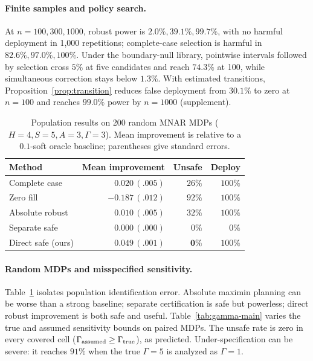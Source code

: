 \documentclass[letterpaper]{article}
\theoremstyle{remark}
\begin{document}
\paragraph{Finite samples and policy search.}
At $n=100,300,1000$, robust power is $2.0\%,39.1\%,99.7\%$, with no harmful deployment in 1,000 repetitions; complete-case selection is harmful in $82.6\%,97.0\%,100\%$. Under the boundary-null library, pointwise intervals followed by selection cross $5\%$ at five candidates and reach $74.3\%$ at 100, while simultaneous correction stays below $1.3\%$. With estimated transitions, Proposition~\ref{prop:transition} reduces false deployment from $30.1\%$ to zero at $n=100$ and reaches $99.0\%$ power by $n=1000$ (supplement).

\begin{table}[t]
\centering
\small
\caption{Population results on 200 random MNAR MDPs ($H=4,S=5,A=3,\Gamma=3$). Mean improvement is relative to a $0.1$-soft oracle baseline; parentheses give standard errors.}
\label{tab:random}
\begin{tabular}{lrrr}
\toprule
Method & Mean improvement & Unsafe & Deploy \\
\midrule
Complete case & $0.020\,(.005)$ & $26\%$ & $100\%$ \\
Zero fill & $-0.187\,(.012)$ & $92\%$ & $100\%$ \\
Absolute robust & $0.010\,(.005)$ & $32\%$ & $100\%$ \\
Separate safe & $0.000\,(.000)$ & $0\%$ & $0\%$ \\
Direct safe (ours) & $\mathbf{0.049}\,(.001)$ & $\mathbf{0\%}$ & $100\%$ \\
\bottomrule
\end{tabular}
\end{table}

\paragraph{Random MDPs and misspecified sensitivity.}
Table~\ref{tab:random} isolates population identification error. Absolute maximin planning can be worse than a strong baseline; separate certification is safe but powerless; direct robust improvement is both safe and useful. Table~\ref{tab:gamma-main} varies the true and assumed sensitivity bounds on paired MDPs. The unsafe rate is zero in every covered cell ($\Gamma_{\rm assumed}\geq\Gamma_{\rm true}$), as predicted. Under-specification can be severe: it reaches $91\%$ when the true $\Gamma=5$ is analyzed as $\Gamma=1$.
\end{document}
